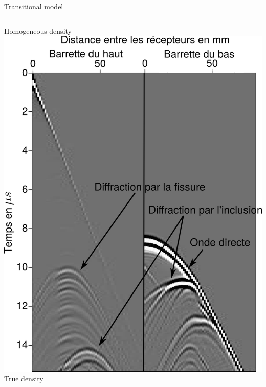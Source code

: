 \documentclass[10pt,xcolor=x11names,compress, notes=show]{beamer}%
\begin{document}
\begin{frame}{Transitional model}
\begin{columns}
		\small{Homogeneous density}
		\centering
		\includegraphics[width=\textwidth]{img/rho_mono/data_rho_vrai.png}\\
		\small{True density}
	\end{columns}
	
	
\end{frame}
\end{document}
